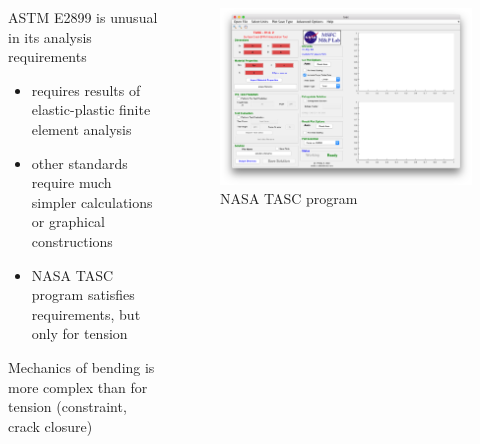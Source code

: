 \begin{frame}
\begin{columns}
\begin{column}{0.45\textwidth}
ASTM E2899 is unusual in its analysis requirements
\begin{itemize}
\item requires results of elastic-plastic finite element analysis
\item other standards require much simpler calculations or graphical constructions
\item NASA TASC program satisfies requirements, but only for tension
\end{itemize}
Mechanics of bending is more complex than for tension (constraint, crack closure)
\end{column}
\begin{column}{0.45\textwidth}
\begin{figure}
\centering
\includegraphics[width=\columnwidth]{tasc-original}
\caption{NASA TASC program}
\end{figure}
\end{column}
\end{columns}
\note{
\vfill
}
\end{frame}

